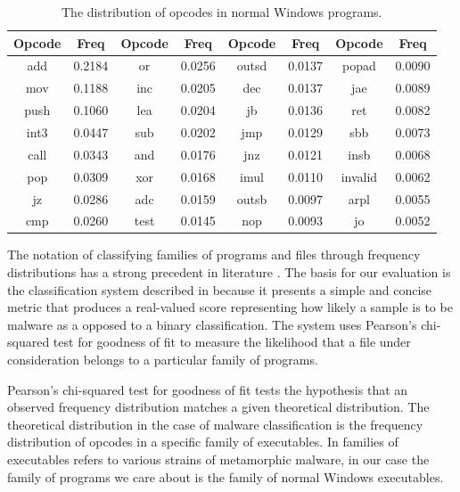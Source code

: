    \begin{table}
        \centering
        \begin{tabular}{|c|c||c|c||c|c||c|c|}
            \hline
            Opcode & Freq & Opcode & Freq & Opcode & Freq & Opcode & Freq \\
            \hline
            add & 0.2184 & or & 0.0256 & outsd & 0.0137 & popad & 0.0090 \\
            \hline
            mov & 0.1188 & inc & 0.0205 & dec & 0.0137 & jae & 0.0089 \\
            \hline
           push & 0.1060 & lea & 0.0204 & jb & 0.0136 & ret & 0.0082 \\
            \hline
           int3 & 0.0447 & sub & 0.0202 & jmp & 0.0129 & sbb & 0.0073 \\
            \hline
           call & 0.0343 & and & 0.0176 & jnz & 0.0121 & insb & 0.0068 \\
            \hline
            pop & 0.0309 & xor & 0.0168 & imul & 0.0110 & invalid & 0.0062 \\ 
            \hline
             jz & 0.0286 & adc & 0.0159 & outsb & 0.0097 & arpl & 0.0055 \\ 
            \hline
            cmp & 0.0260 & test & 0.0145 & nop & 0.0093 & jo & 0.0052 \\
            \hline
        \end{tabular}
        \caption{The distribution of opcodes in normal Windows programs.}
        \label{tab:results-opcode-dist}
    \end{table}

    The notation of classifying families of programs and files through frequency
    distributions has a strong precedent in literature
    \cite{chisquared,hmm_evade,stat_model,fileprints}. The basis for our
    evaluation is the classification system described in \cite{chisquared}
    because it presents a simple and concise metric that produces a real-valued
    score representing how likely a sample is to be malware as a opposed to a
    binary classification. The system uses Pearson's chi-squared test for
    goodness of fit to measure the likelihood that a file under consideration
    belongs to a particular family of programs.

    Pearson's chi-squared test for goodness of fit tests the hypothesis that
    an observed frequency distribution matches a given theoretical
    distribution. The theoretical distribution in the case of malware
    classification is the frequency distribution of opcodes in a specific
    family of executables. In \cite{chisquared} families of executables
    refers to various strains of metamorphic malware, in our case the family
    of programs we care about is the family of normal Windows executables.
    
